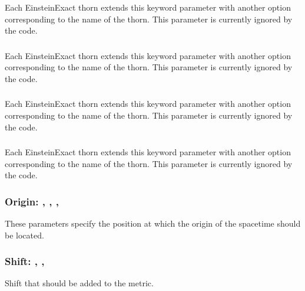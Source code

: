 \documentclass{article}
\begin{document}
\subsubsection{}
Each EinsteinExact thorn extends this keyword parameter with another option
corresponding to the name of the thorn. This parameter is currently ignored
by the code.

\subsubsection{}
Each EinsteinExact thorn extends this keyword parameter with another option
corresponding to the name of the thorn. This parameter is currently ignored
by the code.

\subsubsection{}
Each EinsteinExact thorn extends this keyword parameter with another option
corresponding to the name of the thorn. This parameter is currently ignored
by the code.

\subsubsection{}
Each EinsteinExact thorn extends this keyword parameter with another option
corresponding to the name of the thorn. This parameter is currently ignored
by the code.

\subsubsection{Origin: , , , }
These parameters specify the position at which the origin of the spacetime
should be located.

\subsubsection{Shift: , , }
Shift that should be added to the metric.
\end{document}
